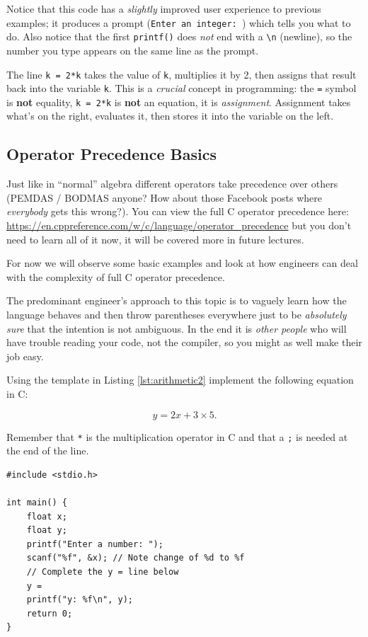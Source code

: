 \documentclass{lab}
\begin{document}
Notice that this code has a \textit{slightly} improved user experience to previous examples; it produces a prompt (\texttt{Enter an integer: }) which tells you what to do. Also notice that the first \texttt{printf()} does \textit{not} end with a \texttt{\textbackslash n} (newline), so the number you type appears on the same line as the prompt.

The line \texttt{k = 2*k} takes the value of \texttt{k}, multiplies it by 2, then assigns that result back into the variable \texttt{k}. This is a \textit{crucial} concept in programming: the \texttt{=} symbol is \textbf{not} equality, \texttt{k = 2*k} is \textbf{not} an equation, it is \textit{assignment}. Assignment takes what's on the right, evaluates it, then stores it into the variable on the left.

\subsection{Operator Precedence Basics}

Just like in ``normal'' algebra different operators take precedence over others (PEMDAS / BODMAS anyone? How about those Facebook posts where \textit{everybody} gets this wrong?). You can view the full C operator precedence here: \url{https://en.cppreference.com/w/c/language/operator_precedence} but you don't need to learn all of it now, it will be covered more in future lectures.

For now we will observe some basic examples and look at how engineers can deal with the complexity of full C operator precedence.

The predominant engineer's approach to this topic is to vaguely learn how the language behaves and then throw parentheses everywhere just to be \textit{absolutely sure} that the intention is not ambiguous. In the end it is \textit{other people} who will have trouble reading your code, not the compiler, so you might as well make their job easy.

\begin{task}{}{}
Using the template in Listing \ref{lst:arithmetic2} implement the following equation in C:

\begin{equation}\label{eq:fraction}
y = 2x+3\times5.
\end{equation}

Remember that \texttt{*} is the multiplication operator in C and that a \texttt{;} is needed at the end of the line.


\begin{lstlisting}[style=CStyle,caption=A basic arithmetic example,label=lst:arithmetic2]
#include <stdio.h>

int main() {
	float x;
	float y;
	printf("Enter a number: ");
	scanf("%f", &x); // Note change of %d to %f
	// Complete the y = line below
	y = 
	printf("y: %f\n", y);
	return 0;
}
\end{lstlisting}
\end{task}
\end{document}

